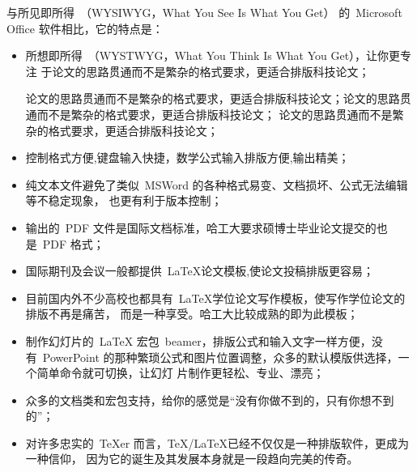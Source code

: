    与所见即所得~（WYSIWYG，What You See Is What You Get） 的~Microsoft Office
软件相比，它的特点是：
\begin{itemize}
      \item 所想即所得~（WYSTWYG，What You Think Is What You Get），让你更专注
于论文的思路贯通而不是繁杂的格式要求，更适合排版科技论文；

论文的思路贯通而不是繁杂的格式要求，更适合排版科技论文；论文的思路贯通而不是繁杂的格式要求，更适合排版科技论文；
论文的思路贯通而不是繁杂的格式要求，更适合排版科技论文；
      \item 控制格式方便,键盘输入快捷，数学公式输入排版方便,输出精美；
      \item 纯文本文件避免了类似~MSWord 的各种格式易变、文档损坏、公式无法编辑等不稳定现象，
      也更有利于版本控制；
      \item 输出的~PDF 文件是国际文档标准，哈工大要求硕博士毕业论文提交的也是~PDF 格式；
      \item 国际期刊及会议一般都提供~\LaTeX 论文模板,使论文投稿排版更容易；
      \item 目前国内外不少高校也都具有~\LaTeX{}学位论文写作模板，使写作学位论文的排版不再是痛苦，
      而是一种享受。哈工大比较成熟的即为此模板；
      \item 制作幻灯片的~LaTeX 宏包~beamer，排版公式和输入文字一样方便，没有~PowerPoint
的那种繁琐公式和图片位置调整，众多的默认模版供选择，一个简单命令就可切换，让幻灯
片制作更轻松、专业、漂亮；
      \item  众多的文档类和宏包支持，给你的感觉是``没有你做不到的，只有你想不到的''；
      \item  对许多忠实的~TeXer 而言，\TeX/\LaTeX 已经不仅仅是一种排版软件，更成为一种信仰，
      因为它的诞生及其发展本身就是一段趋向完美的传奇。
\end{itemize}

